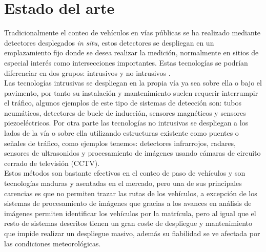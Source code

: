 \documentclass[../proyecto.tex]{subfiles}
\begin{document}
\chapter{Estado del arte}

Tradicionalmente el conteo de vehículos en vías públicas se ha realizado mediante detectores desplegados \textit{in situ}, estos detectores se despliegan en un emplazamiento fijo donde se desea realizar la medición, normalmente en sitios de especial interés como intersecciones importantes. Estas tecnologías se podrían diferenciar en dos grupos: intrusivos y no intrusivos \cite{MIMBELA20078}.\\

Las tecnologías intrusivas se despliegan en la propia vía ya sea sobre ella o bajo el pavimento, por tanto su instalación y mantenimiento suelen requerir interrumpir el tráfico, algunos ejemplos de este tipo de sistemas de detección son: tubos neumáticos, detectores de bucle de inducción, sensores magnéticos y sensores piezoeléctricos. Por otra parte las tecnologías no intrusivas se despliegan a los lados de la vía o sobre ella utilizando estructuras existente como puentes o señales de tráfico, como ejemplos tenemos: detectores infrarrojos, radares, sensores de ultrasonidos y  procesamiento de imágenes usando cámaras de circuito cerrado de televisión (CCTV).\\

 Estos métodos son bastante efectivos en el conteo de paso de vehículos \cite{CZYZEWSKI20196} y son tecnologías maduras y asentadas en el mercado, pero una de sus principales carencias es que no permiten trazar las rutas de los vehículos, a excepción de los sistemas de procesamiento de imágenes que gracias a los avances en análisis de imágenes permiten identificar los vehículos por la matrícula, pero al igual que el resto de sistemas descritos tienen un gran coste de despliegue y mantenimiento que impide realizar un despliegue masivo, además su fiabilidad se ve afectada por las condiciones meteorológicas.\\
\end{document}
